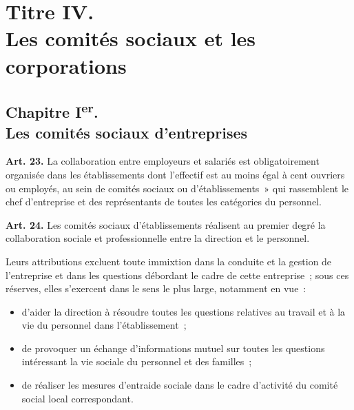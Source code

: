 \documentclass[french,twoside]{book} %
\newcommand{\labelchar}[1]{\textbf{\color{rubric} #1}}
\begin{document}
\section[Titre IV. Les comités sociaux et les corporations]{Titre IV. \\
Les comités sociaux et les corporations}\renewcommand{\leftmark}{Titre IV. \\
Les comités sociaux et les corporations}

\subsection[Chapitre Ier. Les comités sociaux d’entreprises]{Chapitre I\textsuperscript{er}. \\
Les comités sociaux d’entreprises}
\noindent \labelchar{Art. 23.} La collaboration entre employeurs et salariés est obligatoirement organisée dans les établissements dont l’effectif est au moins égal à cent ouvriers ou employés, au sein de comités sociaux ou d’établissements » qui rassemblent le chef d’entreprise et des représentants de toutes les catégories du personnel.\par
\bigbreak
\noindent \labelchar{Art. 24.} Les comités sociaux d’établissements réalisent au premier degré la collaboration sociale et professionnelle entre la direction et le personnel.\par
Leurs attributions excluent toute immixtion dans la conduite et la gestion de l’entreprise et dans les questions débordant le cadre de cette entreprise ; sous ces réserves, elles s’exercent dans le sens le plus large, notamment en vue :\par

\begin{itemize}[itemsep=0pt,]
\item d’aider la direction à résoudre toutes les questions relatives au travail et à la vie du personnel dans l’établissement ;
\item de provoquer un échange d’informations mutuel sur toutes les questions intéressant la vie sociale du personnel et des familles ;
\item de réaliser les mesures d’entraide sociale dans le cadre d’activité du comité social local correspondant.
\end{itemize}
\end{document}
